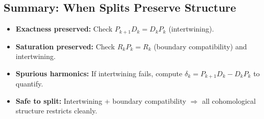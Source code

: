 \subsection{Summary: When Splits Preserve Structure}
\label{subsec:split-summary}

\begin{tcolorbox}[colback=black!3, colframe=black!50, title={Compatibility Checklist}]
\begin{itemize}[itemsep=0.3em]
\item \textbf{Exactness preserved:} Check $P_{k+1} D_k = D_k P_k$ (intertwining).
\item \textbf{Saturation preserved:} Check $R_k P_k = R_k$ (boundary compatibility) and intertwining.
\item \textbf{Spurious harmonics:} If intertwining fails, compute $\delta_k = P_{k+1} D_k - D_k P_k$ to quantify.
\item \textbf{Safe to split:} Intertwining + boundary compatibility $\Rightarrow$ all cohomological structure restricts cleanly.
\end{itemize}
\end{tcolorbox}
